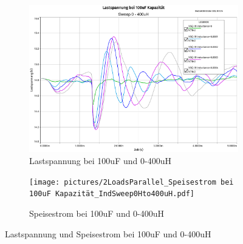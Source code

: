 \begin{figure}[H]
	\centering
	\begin{subfigure}{/13}
		\centering
		\includegraphics[width=\textwidth]{pictures/2LoadsParallel_Lastspannung bei 100uF_IndSweep0Hto400uH.pdf}
		\caption{Lastspannung bei 100uF und 0-400uH}
		\label{pic:loadvoltage_100uF}
	\end{subfigure}
	\hfill
	\begin{subfigure}{/13}
		\centering
		\texttt{[image: pictures/2LoadsParallel\_Speisestrom bei 100uF Kapazität\_IndSweep0Hto400uH.pdf]}
		\caption{Speisestrom bei 100uF und 0-400uH}
		\label{pic:supplycurrent_100uF}
	\end{subfigure}
	\caption{Lastspannung und Speisestrom bei 100uF und 0-400uH}
	\label{pic:supplycurrent_loadvoltage_100uF}
\end{figure}
